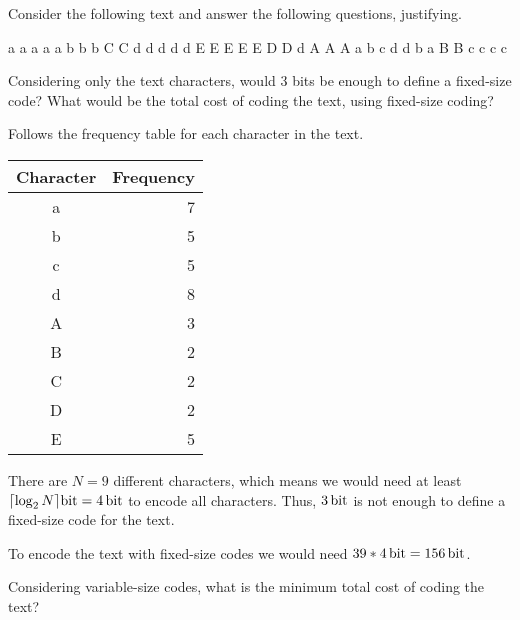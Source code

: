 {
Consider the following text and answer the following questions, justifying.

\begin{center}
    a a a a a b b b C C d d d d d E E E E E D D d A A A a b c d d b a B B c c c c
\end{center}

Considering only the text characters, would 3 bits be enough to define a fixed-size code? What would be the total cost of coding the text, using fixed-size coding?

\ansseparator

Follows the frequency table for each character in the text.
\begin{center} \begin{tabular}{c | r}
    \textbf{Character} & \textbf{Frequency} \\ \hline
    a                  &                  7 \\
    b                  &                  5 \\
    c                  &                  5 \\
    d                  &                  8 \\
    A                  &                  3 \\
    B                  &                  2 \\
    C                  &                  2 \\
    D                  &                  2 \\
    E                  &                  5 \\
\end{tabular} \end{center}

There are $N=9$ different characters, which means we would need at least $\lceil \log_2{N} \rceil \SI{}{\bit} = \SI{4}{\bit}$ to encode all characters. Thus, $\SI{3}{\bit}$ is not enough to define a fixed-size code for the text.

To encode the text with fixed-size codes we would need $39 * \SI{4}{\bit} = \SI{156}{\bit}$.

Considering variable-size codes, what is the minimum total cost of coding the text?

\ansseparator

}
